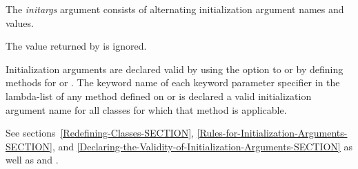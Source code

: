 \begin{defun}
The {\it initargs\/} argument consists of alternating initialization
argument names and values.


The value returned by  is ignored.


Initialization arguments are declared valid by using the 
 option to  or by defining methods for 
 or .  The
keyword name of each keyword parameter specifier in the lambda-list of
any method defined on  or 
 is declared a valid initialization argument name
for all classes for which that method is applicable.


See sections~\ref{Redefining-Classes-SECTION},
\ref{Rules-for-Initialization-Arguments-SECTION}, and
\ref{Declaring-the-Validity-of-Initialization-Arguments-SECTION} as well as
 and .



\end{defun}
